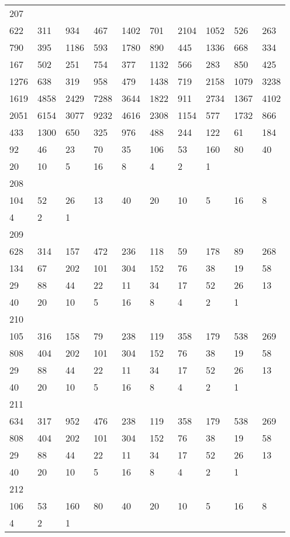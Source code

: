 \begin{longtable}{*{10}{l}}
207&&&&&&&&&\\
622& 311& 934& 467& 1402& 701& 2104& 1052& 526& 263\\
790& 395& 1186& 593& 1780& 890& 445& 1336& 668& 334\\
167& 502& 251& 754& 377& 1132& 566& 283& 850& 425\\
1276& 638& 319& 958& 479& 1438& 719& 2158& 1079& 3238\\
1619& 4858& 2429& 7288& 3644& 1822& 911& 2734& 1367& 4102\\
2051& 6154& 3077& 9232& 4616& 2308& 1154& 577& 1732& 866\\
433& 1300& 650& 325& 976& 488& 244& 122& 61& 184\\
92& 46& 23& 70& 35& 106& 53& 160& 80& 40\\
20& 10& 5& 16& 8& 4& 2& 1& \\

208&&&&&&&&&\\
104& 52& 26& 13& 40& 20& 10& 5& 16& 8\\
4& 2& 1& \\

209&&&&&&&&&\\
628& 314& 157& 472& 236& 118& 59& 178& 89& 268\\
134& 67& 202& 101& 304& 152& 76& 38& 19& 58\\
29& 88& 44& 22& 11& 34& 17& 52& 26& 13\\
40& 20& 10& 5& 16& 8& 4& 2& 1& \\

210&&&&&&&&&\\
105& 316& 158& 79& 238& 119& 358& 179& 538& 269\\
808& 404& 202& 101& 304& 152& 76& 38& 19& 58\\
29& 88& 44& 22& 11& 34& 17& 52& 26& 13\\
40& 20& 10& 5& 16& 8& 4& 2& 1& \\

211&&&&&&&&&\\
634& 317& 952& 476& 238& 119& 358& 179& 538& 269\\
808& 404& 202& 101& 304& 152& 76& 38& 19& 58\\
29& 88& 44& 22& 11& 34& 17& 52& 26& 13\\
40& 20& 10& 5& 16& 8& 4& 2& 1& \\

212&&&&&&&&&\\
106& 53& 160& 80& 40& 20& 10& 5& 16& 8\\
4& 2& 1& \\


\end{longtable}
